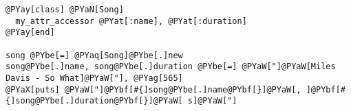 \begin{Verbatim}[commandchars=@\[\]]
@PYay[class] @PYaN[Song]
  my_attr_accessor @PYat[:name], @PYat[:duration]
@PYay[end]

song @PYbe[=] @PYaq[Song]@PYbe[.]new
song@PYbe[.]name, song@PYbe[.]duration @PYbe[=] @PYaW["]@PYaW[Miles Davis - So What]@PYaW["], @PYag[565]
@PYaX[puts] @PYaW["]@PYbf[#{]song@PYbe[.]name@PYbf[}]@PYaW[, ]@PYbf[#{]song@PYbe[.]duration@PYbf[}]@PYaW[ s]@PYaW["]
\end{Verbatim}
